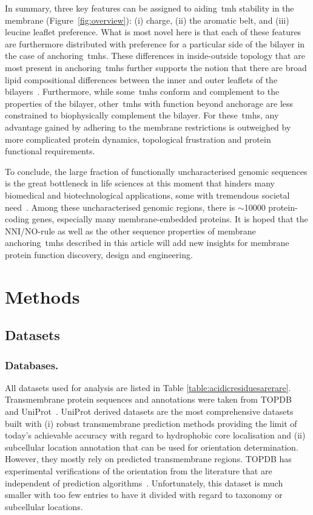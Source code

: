 In summary, three key features can be assigned to aiding~\gls{tmh} stability in the membrane (Figure~\ref{fig:overview}): (i) charge, (ii) the aromatic belt, and (iii) leucine leaflet preference.
What is most novel here is that each of these features are furthermore distributed with preference for a particular side of the bilayer in the case of anchoring~\gls{tmh}s.
These differences in inside-outside topology that are most present in anchoring~\gls{tmh}s further supports the notion that there are broad lipid compositional differences between the inner and outer leaflets of the bilayers~\cite{Sharpe2010}.
Furthermore, while some~\gls{tmh}s conform and complement to the properties of the bilayer, other~\gls{tmh}s with function beyond anchorage are less constrained to biophysically complement the bilayer.
For these~\gls{tmh}s, any advantage gained by adhering to the membrane restrictions is outweighed by more complicated protein dynamics, topological frustration and protein functional requirements.

To conclude, the large fraction of functionally uncharacterised genomic sequences is the great bottleneck in life sciences at this moment that hinders many biomedical and biotechnological applications, some with tremendous societal need~\cite{Eisenhaber2012,Kuznetsov2013}.
Among these uncharacterised genomic regions, there is \(\sim\)10000 protein-coding genes, especially many membrane-embedded proteins.
It is hoped that the NNI/NO-rule as well as the other sequence properties of membrane anchoring~\gls{tmh}s described in this article will add new insights for membrane protein function discovery, design and engineering.

\section{Methods}

\subsection{Datasets}
\subsubsection{Databases.}
All datasets used for analysis are listed in Table \ref{table:acidicresiduesarerare}.
Transmembrane protein sequences and annotations were taken from TOPDB~\cite{Dobson2015} and UniProt~\cite{TheUniProtConsortium2014}.
UniProt derived datasets are the most comprehensive datasets built with (i) robust transmembrane prediction methods providing the limit of today’s achievable accuracy with regard to hydrophobic core localisation and (ii) subcellular location annotation that can be used for orientation determination.
However, they mostly rely on predicted transmembrane regions.
TOPDB has experimental verifications of the orientation from the literature that are independent of prediction algorithms~\cite{Dobson2015}.
Unfortunately, this dataset is much smaller with too few entries to have it divided with regard to taxonomy or subcellular locations.

